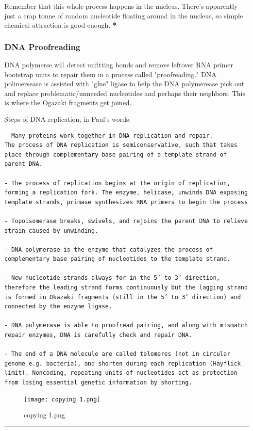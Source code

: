 \documentclass[letterpaper]{article}
\begin{document}
Remember that this whole process happens in the nucleus. There's
apparently just a crap tonne of random nucleotide floating around in the
nucleus, so simple chemical attraction is good enough. \textbf{*}

\subsubsection{DNA Proofreading}
\label{sec:org524b968}
DNA polymerse will detect unfitting bonds and remove leftover RNA primer
bootstrap units to repair them in a process called "proofreading." DNA
polimersease is assisted with "glue" ligase to help the DNA polymerease
pick out and replace problematic/unneeded nucleotides and perhaps their
neighbors. This is where the Ogazaki fragments get joined.

Steps of DNA replication, in Paul's words:

\begin{verbatim}
- Many proteins work together in DNA replication and repair. 
The process of DNA replication is semiconservative, such that takes place through complementary base pairing of a template strand of parent DNA. 

- The process of replication begins at the origin of replication, forming a replication fork. The enzyme, helicase, unwinds DNA exposing template strands, primase synthesizes RNA primers to begin the process

- Topoisomerase breaks, swivels, and rejoins the parent DNA to relieve strain caused by unwinding. 

- DNA polymerase is the enzyme that catalyzes the process of complementary base pairing of nucleotides to the template strand. 

- New nucleotide strands always for in the 5’ to 3’ direction, therefore the leading strand forms continuously but the lagging strand is formed in Okazaki fragments (still in the 5’ to 3’ direction) and connected by the enzyme ligase. 

- DNA polymerase is able to proofread pairing, and along with mismatch repair enzymes, DNA is carefully check and repair DNA. 

- The end of a DNA molecule are called telomeres (not in circular genome e.g. bacteria), and shorten during each replication (Hayflick limit). Noncoding, repeating units of nucleotides act as protection from losing essential genetic information by shorting. 
\end{verbatim}

\begin{figure}[htbp]
\centering
\texttt{[image: copying 1.png]}
\caption{copying 1.png}
\end{figure}

\noindent\rule{\textwidth}{0.5pt}
\end{document}
